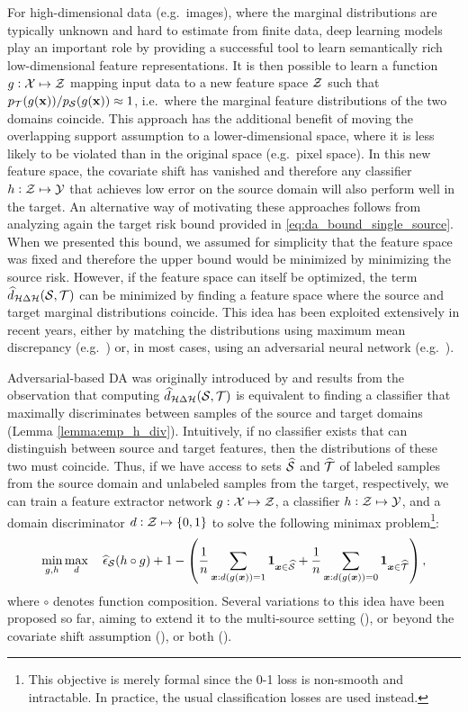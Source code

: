 For high-dimensional data (e.g.\ images), where the marginal distributions are typically unknown and hard to estimate from finite data, deep learning models play an important role by providing a successful tool to learn semantically rich low-dimensional feature representations. It is then possible to learn a function $g:{\mathcal{X}} \mapsto {\mathcal{Z}}$ mapping input data to a new feature space ${\mathcal{Z}}$ such that $p_{{\mathcal{T}}}(g({\mathbf{x}}))/p_{{\mathcal{S}}}(g({\mathbf{x}})) \approx 1$, i.e.\ where the marginal feature distributions of the two domains coincide. This approach has the additional benefit of moving the overlapping support assumption to a lower-dimensional space, where it is less likely to be violated than in the original space (e.g.\ pixel space). In this new feature space, the covariate shift has vanished and therefore any classifier $h:{\mathcal{Z}} \mapsto {\mathcal{Y}}$ that achieves low error on the source domain will also perform well in the target. An alternative way of motivating these approaches follows from analyzing again the target risk bound provided in \eqref{eq:da_bound_single_source}. When we presented this bound, we assumed for simplicity that the feature space was fixed and therefore the upper bound would be minimized by minimizing the source risk. However, if the feature space can itself be optimized, the term $\widehat{d}_{{\mathcal{H}} \Delta {\mathcal{H}}}({\mathcal{S}}, {\mathcal{T}})$ can be minimized by finding a feature space where the source and target marginal distributions coincide. This idea has been exploited extensively in recent years, either by matching the distributions using maximum mean discrepancy (e.g.\ \citet{Long2015,Guo2018}) or, in most cases, using an adversarial neural network (e.g.\ \citet{Zhao2018,Ganin2015,Pei2018,Sebag2019}).

Adversarial-based DA was originally introduced by \citet{Ganin2015} and results from the observation that
computing $\widehat{d}_{{\mathcal{H}} \Delta {\mathcal{H}}}({\mathcal{S}}, {\mathcal{T}})$ is equivalent to finding a classifier that maximally discriminates between samples of the source and target domains (Lemma \ref{lemma:emp_h_div}). Intuitively, if no classifier exists that can distinguish between source and target features, then the distributions of these two must coincide. Thus, if we have access to sets $\widehat{{\mathcal{S}}}$ and $\widehat{{\mathcal{T}}}$ of labeled samples from the source domain and unlabeled samples from the target, respectively, we can train a feature extractor network $g:{\mathcal{X}} \mapsto {\mathcal{Z}}$, a classifier $h:{\mathcal{Z}} \mapsto {\mathcal{Y}}$, and a domain discriminator $d:{\mathcal{Z}} \mapsto \{0,1\}$ to solve the following minimax problem\footnote{This objective is merely formal since the 0-1 loss is non-smooth and intractable. In practice, the usual classification losses are used instead.}:
\begin{equation}
    \label{eq:dann_obj}
    \min_{g,h} \max_d \quad \widehat{\epsilon}_{\mathcal{S}}(h \circ g) + 1 - \left(\frac{1}{n} \sum_{{\bm{x}}: d(g({\bm{x}}))=1} \bm{1}_{{\bm{x}} \in \widehat{{\mathcal{S}}}} + \frac{1}{n} \sum_{{\bm{x}}: d(g({\bm{x}}))=0} \bm{1}_{{\bm{x}} \in \widehat{{\mathcal{T}}}}\right),
\end{equation}
where $\circ$ denotes function composition. Several variations to this idea have been proposed so far, aiming to extend it to the multi-source setting (\citet{Zhao2018}), or beyond the covariate shift assumption (\citet{Pei2018}), or both (\citet{Sebag2019}).

